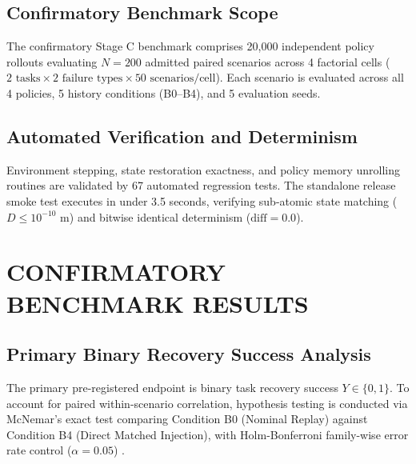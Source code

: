 \documentclass[letterpaper, 10 pt, conference]{ieeeconf}
\begin{document}
\subsection{Confirmatory Benchmark Scope}
The confirmatory Stage C benchmark comprises 20,000 independent policy rollouts evaluating $N=200$ admitted paired scenarios across 4 factorial cells ($2\text{ tasks} \times 2\text{ failure types} \times 50\text{ scenarios/cell}$). Each scenario is evaluated across all 4 policies, 5 history conditions (B0–B4), and 5 evaluation seeds.

\subsection{Automated Verification and Determinism}
Environment stepping, state restoration exactness, and policy memory unrolling routines are validated by 67 automated regression tests. The standalone release smoke test executes in under 3.5 seconds, verifying sub-atomic state matching ($D \le 10^{-10}\text{ m}$) and bitwise identical determinism ($\text{diff} = 0.0$).

\section{CONFIRMATORY BENCHMARK RESULTS}
\label{sec:results}

\subsection{Primary Binary Recovery Success Analysis}
The primary pre-registered endpoint is binary task recovery success $Y \in \{0, 1\}$. To account for paired within-scenario correlation, hypothesis testing is conducted via McNemar's exact test comparing Condition B0 (Nominal Replay) against Condition B4 (Direct Matched Injection), with Holm-Bonferroni family-wise error rate control ($\alpha = 0.05$) \cite{mcnemar1947note, holm1979simple}.
\end{document}
